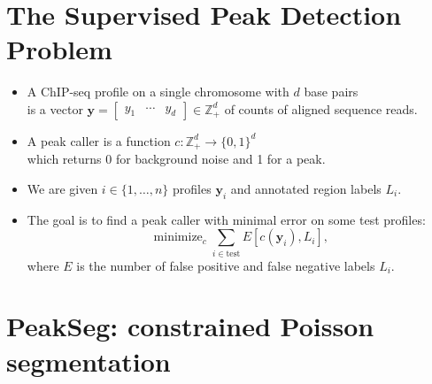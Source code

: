 \documentclass[legalpaper]{article}
\newcommand{\ZZ}{\mathbb Z}
\DeclareMathOperator*{\minimize}{minimize}
\begin{document}
\section*{The Supervised Peak Detection Problem}

\begin{itemize}
\item A ChIP-seq profile on a single
chromosome with $d$ base pairs\\ is a vector $\mathbf y=
\left[
  \begin{array}{ccc}
    y_1 & \cdots & y_d
  \end{array}
\right]\in\ZZ_+^d$ of counts of aligned sequence reads. 
\item A peak caller is a function $c:\ZZ_+^d
  \rightarrow \{0, 1\}^d$\\
  which returns 0 for background noise and 1 for a peak.
\item We are given $i\in\{1,\dots, n\}$ profiles 
  $\mathbf y_i$ and annotated region labels $L_i$.
\item The goal is to find a peak caller with minimal error on some
test profiles:
\begin{equation*}
  \label{eq:min_error}
  \minimize_c \sum_{i\in\text{test}} E[c(\mathbf y_i),  L_i],
\end{equation*}
where $E$ is the number of false positive and false negative labels $L_i$.
\end{itemize}

\newpage 

\section*{PeakSeg: constrained Poisson segmentation}
\end{document}
